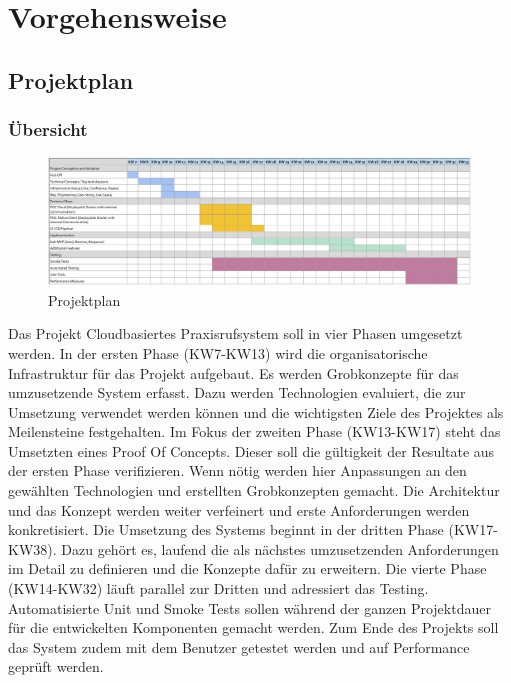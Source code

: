 \section{Vorgehensweise}\label{sec:vorgehensweise}

\subsection{Projektplan}\label{subsec:projektplan}

\subsubsection*{Übersicht}
\begin{figure}[h]
    \label{fig:projectPlan}
    \includegraphics[width=\linewidth]{graphics/Projectplanning}\caption[Projektplan]{Projektplan}
\end{figure}

Das Projekt Cloudbasiertes Praxisrufsystem soll in vier Phasen umgesetzt werden.
In der ersten Phase (KW7-KW13) wird die organisatorische Infrastruktur für das Projekt aufgebaut.
Es werden Grobkonzepte für das umzusetzende System erfasst.
Dazu werden Technologien evaluiert, die zur Umsetzung verwendet werden können und
die wichtigsten Ziele des Projektes als Meilensteine festgehalten.
Im Fokus der zweiten Phase (KW13-KW17) steht das Umsetzten eines Proof Of Concepts.
Dieser soll die gültigkeit der Resultate aus der ersten Phase verifizieren.
Wenn nötig werden hier Anpassungen an den gewählten Technologien und erstellten Grobkonzepten gemacht.
Die Architektur und das Konzept werden weiter verfeinert und erste Anforderungen werden konkretisiert.
Die Umsetzung des Systems beginnt in der dritten Phase (KW17-KW38).
Dazu gehört es, laufend die als nächstes umzusetzenden Anforderungen im Detail zu definieren und die Konzepte dafür zu erweitern.
Die vierte Phase (KW14-KW32) läuft parallel zur Dritten und adressiert das Testing.
Automatisierte Unit und Smoke Tests sollen während der ganzen Projektdauer für die entwickelten Komponenten gemacht werden.
Zum Ende des Projekts soll das System zudem mit dem Benutzer getestet werden und auf Performance geprüft werden.

